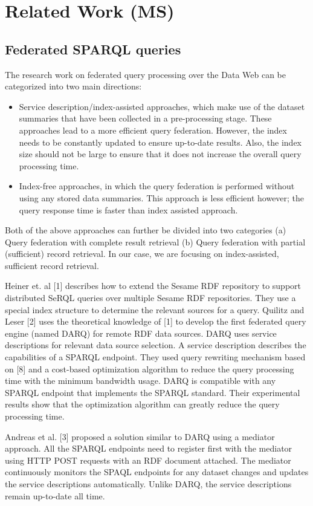 \documentclass{sig-alternate}  %
\begin{document}
\section{Related Work (MS)}
\subsection{Federated SPARQL queries}
The research work on federated query processing over the Data Web
can be categorized into two main directions: 
\begin{itemize}
\item Service description/index-assisted approaches, which make use of the
dataset summaries that have been collected in a pre-processing stage.
These approaches lead to a more efficient query federation. However,
the index needs to be constantly updated to ensure up-to-date results.
Also, the index size should not be large to ensure that it does not
increase the overall query processing time. 
\item Index-free approaches, in which the query federation is performed
without using any stored data summaries. This approach is less efficient
however; the query response time is faster than index assisted approach. 
\end{itemize}
Both of the above approaches can further be divided into two categories
(a) Query federation with complete result retrieval (b) Query federation
with partial (sufficient) record retrieval. In our case, we are focusing
on index-assisted, sufficient record retrieval.

Heiner et. al {[}1{]} describes how to extend the Sesame RDF
repository to support distributed SeRQL queries over multiple Sesame
RDF repositories. They use a special index structure to determine
the relevant sources for a query. Quilitz and Leser {[}2{]}
uses the theoretical knowledge of {[}1{]} to develop the first federated
query engine (named DARQ) for remote RDF data sources. DARQ uses service
descriptions for relevant data source selection. A service description
describes the capabilities of a SPARQL endpoint. They used query rewriting
mechanism based on {[}8{]} and a cost-based optimization algorithm
to reduce the query processing time with the minimum bandwidth usage.
DARQ is compatible with any SPARQL endpoint that implements the SPARQL
standard. Their experimental results show that the optimization algorithm
can greatly reduce the query processing time.

Andreas et al. {[}3{]} proposed a solution similar to DARQ using a
mediator approach. All the SPARQL endpoints need to register first
with the mediator using HTTP POST requests with an RDF document attached.
The mediator continuously monitors the SPAQL endpoints for any dataset
changes and updates the service descriptions automatically. Unlike
DARQ, the service descriptions remain up-to-date all time. 
\end{document}
